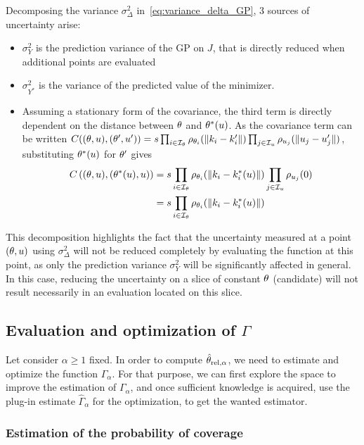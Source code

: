 \documentclass[../../Main_ManuscritThese.tex]{subfiles}
\begin{document}
Decomposing the variance $\sigma^2_{\Delta}$ in~\cref{eq:variance_delta_GP}, 3 sources of uncertainty arise:
\begin{itemize}
\item $\sigma^2_{Y}$ is the prediction variance of the GP on $J$, that is directly reduced when additional points are evaluated
\item $\sigma^2_{Y^*}$ is the variance of the predicted value of the minimizer.
\item Assuming a stationary form of the covariance, the third term is directly dependent on the distance between $\theta$ and $\theta^*(u)$. As the covariance term can be written $C((\theta,u), (\theta',u')) = s \prod_{i\in\mathcal{I}_{\theta}}\rho_{\theta_i}(\|k_i - k'_i\|) \prod_{j\in\mathcal{I}_{u}} \rho_{u_j}(\|u_j - u'_j\|)$, substituting $\theta^*(u)$ for $\theta^\prime$ gives
\begin{align}
  C\left((\theta,u),(\theta^*(u),u)\right) &= s \prod_{i\in\mathcal{I}_{\theta}}\rho_{\theta_i}(\|k_i - k^*_i(u)\|)\prod_{j\in\mathcal{I}_{u}} \rho_{u_j}(0) \\
  &=s \prod_{i\in\mathcal{I}_{\theta}}\rho_{\theta_i}(\|k_i - k^*_i(u)\|)
\end{align}
\end{itemize}
This decomposition highlights the fact that the uncertainty measured at a point $(\theta, u)$ using $\sigma_{\Delta}^2$ will not be reduced completely by evaluating the function at this point, as only the prediction variance $\sigma_Y^2$ will be significantly affected in general. In this case, reducing the uncertainty on a slice of constant $\theta$ (candidate) will not result necessarily in an evaluation located on this slice.


\subsection{Evaluation and optimization of $\Gamma$}
Let consider $\alpha\geq 1$ fixed. In order to compute $\hat{\theta}_{\mathrm{rel, \alpha}}$, we need to estimate and optimize the function $\Gamma_{\alpha}$. For that purpose, we can first explore the space to improve the estimation of $\Gamma_{\alpha}$, and once sufficient knowledge is acquired, use the plug-in estimate $\hat{\Gamma}_{\alpha}$ for the optimization, to get the wanted estimator.
\subsubsection{Estimation of the probability of coverage}
\end{document}
